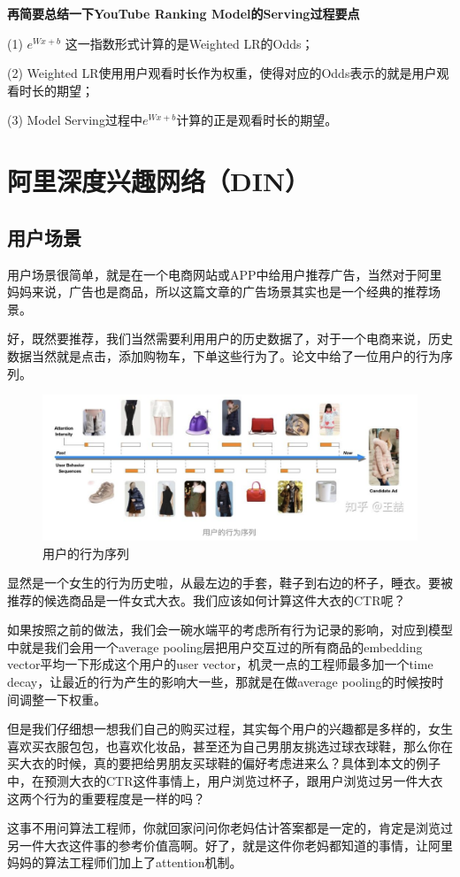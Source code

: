 \documentclass[12pt]{article}
\begin{document}
\textbf{再简要总结一下YouTube Ranking Model的Serving过程要点}

(1) $e^{Wx+b}$  这一指数形式计算的是Weighted LR的Odds；

(2) Weighted LR使用用户观看时长作为权重，使得对应的Odds表示的就是用户观看时长的期望；

(3) Model Serving过程中$e^{Wx+b}$计算的正是观看时长的期望。

\section{阿里深度兴趣网络（DIN）}
\subsection{用户场景}
用户场景很简单，就是在一个电商网站或APP中给用户推荐广告，当然对于阿里妈妈来说，广告也是商品，所以这篇文章的广告场景其实也是一个经典的推荐场景。

好，既然要推荐，我们当然需要利用用户的历史数据了，对于一个电商来说，历史数据当然就是点击，添加购物车，下单这些行为了。论文中给了一位用户的行为序列。
\begin{figure}[H]
    \centering
    \includegraphics[width=1\textwidth]{fig/Ali_User_Behavior_Sequence.png}
    \caption{用户的行为序列}
\end{figure}

显然是一个女生的行为历史啦，从最左边的手套，鞋子到右边的杯子，睡衣。要被推荐的候选商品是一件女式大衣。我们应该如何计算这件大衣的CTR呢？

\begin{framed}
如果按照之前的做法，我们会一碗水端平的考虑所有行为记录的影响，对应到模型中就是我们会用一个average pooling层把用户交互过的所有商品的embedding vector平均一下形成这个用户的user vector，机灵一点的工程师最多加一个time decay，让最近的行为产生的影响大一些，那就是在做average pooling的时候按时间调整一下权重。

但是我们仔细想一想我们自己的购买过程，其实每个用户的兴趣都是多样的，女生喜欢买衣服包包，也喜欢化妆品，甚至还为自己男朋友挑选过球衣球鞋，那么你在买大衣的时候，真的要把给男朋友买球鞋的偏好考虑进来么？具体到本文的例子中，在预测大衣的CTR这件事情上，用户浏览过杯子，跟用户浏览过另一件大衣这两个行为的重要程度是一样的吗？

这事不用问算法工程师，你就回家问问你老妈估计答案都是一定的，肯定是浏览过另一件大衣这件事的参考价值高啊。好了，就是这件你老妈都知道的事情，让阿里妈妈的算法工程师们加上了attention机制。
\end{framed}
\end{document}

